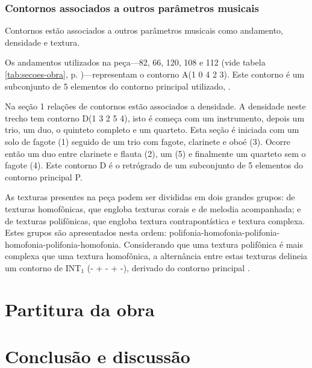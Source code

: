 
\subsection{Contornos associados a outros parâmetros musicais}
\label{sec:cont-assoc-outr}

Contornos estão associados a outros parâmetros musicais como
andamento, densidade e textura.

Os andamentos utilizados na peça---82, 66, 120, 108 e 112 (vide tabela
\ref{tab:secoes-obra}, p. \pageref{tab:secoes-obra})---representam o
contorno A(1 0 4 2 3). Este contorno é um subconjunto de 5 elementos
do contorno principal utilizado, \contpr{}.

Na seção 1 relações de contornos estão associados a densidade. A
densidade neste trecho tem contorno D(1 3 2 5 4), isto é começa com um
instrumento, depois um trio, um duo, o quinteto completo e um
quarteto. Esta seção é iniciada com um solo de fagote (1) seguido de
um trio com fagote, clarinete e oboé (3). Ocorre então um duo entre
clarinete e flauta (2), um  (5) e finalmente um quarteto
sem o fagote (4). Este contorno D é o retrógrado de um subconjunto de
5 elementos do contorno principal P.

As texturas presentes na peça podem ser divididas em dois grandes
grupos: de texturas homofônicas, que engloba texturas corais e de
melodia acompanhada; e de texturas polifônicas, que engloba textura
contrapontística e textura complexa. Estes grupos são apresentados
nesta ordem:
polifonia-homofonia-polifonia-homofonia-polifonia-homofonia. Considerando
que uma textura polifônica é mais complexa que uma textura homofônica,
a alternância entre estas texturas delineia um contorno de INT$_1$ (-
+ - + -), derivado do contorno principal \contpr{}.

\chapter{Partitura da obra \obra{}}
\label{cha:partitura-da-obra}



\chapter{Conclusão e discussão}
\label{cha:conclusao-e-discussao}

